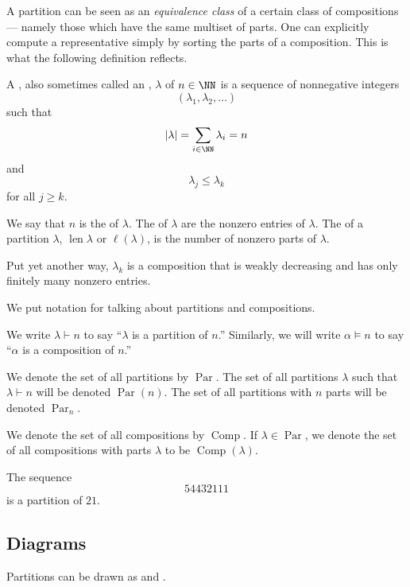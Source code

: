 \documentclass{article}
\DeclareMathOperator{\len}{len}
\DeclareMathOperator{\Par}{Par}
\DeclareMathOperator{\Com}{Comp}
\begin{document}
A partition can be seen as an \textit{equivalence class} of a certain class of compositions--- namely those which have the same multiset of parts.
One can explicitly compute a representative simply by sorting the parts of a composition.
This is what the following definition reflects.

\begin{definition}
    A , also sometimes called an , $\lambda$ of $n \in \NN$ is a sequence of nonnegative integers 
    \[
        (\lambda_1,\lambda_2,\ldots)
    \]
    such that 
    \[
        |\lambda| = \sum_{i\in\NN}\lambda_i = n
    \]
    and 
    \[
        \lambda_j \leq \lambda_k
    \]
    for all $j\geq k$.

    We say that $n$ is the  of $\lambda$.
    The  of $\lambda$ are the nonzero entries of $\lambda$.
    The  of a partition $\lambda$, $\len \lambda$ or $\ell(\lambda)$, is the number of nonzero parts of $\lambda$.
\end{definition}

Put yet another way, $\lambda_k$ is a composition that is weakly decreasing and has only finitely many nonzero entries.

We put notation for talking about partitions and compositions.

\begin{convention}
    We write $\lambda \vdash n$ to say ``$\lambda$ is a partition of $n$.''
    Similarly, we will write $\alpha \models n$ to say ``$\alpha$ is a composition of $n$.''

    We denote the set of all partitions by $\Par$.
    The set of all partitions $\lambda$ such that $\lambda \vdash n$ will be denoted $\Par(n)$.
    The set of all partitions with $n$ parts will be denoted $\Par_{n}$.

    We denote the set of all compositions by $\Com$.
    If $\lambda \in \Par$, we denote the set of all compositions with parts $\lambda$ to be $\Com(\lambda)$.

\end{convention}


\begin{example}
    The sequence
    \[
        54432111
    \]
    is a partition of $21$.
\end{example}


\subsection{Diagrams}
Partitions can be drawn as  and . 
\end{document}
